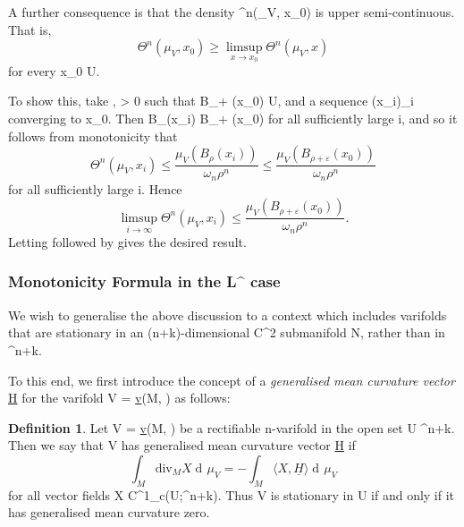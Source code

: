 \documentclass[a4paper, 11pt]{article}
\theoremstyle{plain}
\theoremstyle{definition}
\newtheorem{definition}[theorem]{Definition}
\theoremstyle{remark}
\DeclareMathOperator{\diff}{d \!}
\renewcommand{\div}{\text{div}} %
\numberwithin{equation}{subsection}
\def\({}
\def\){}
\begin{document}
A further consequence is that the density \(\Theta^{n}(\mu_V, x_0)\) is upper semi-continuous. That is,
\begin{equation}
\Theta^{n}(\mu_V, x_0) \geqslant \limsup_{x \rightarrow x_0} \Theta^{n}(\mu_V, x)
\end{equation}
for every \(x_0 \in U\).

To show this, take \(\rho, \varepsilon > 0\) such that \(B_{\rho + \varepsilon}(x_{0}) \subset U\), and a sequence \((x_{i})_{i}\) converging to \(x_{0}\). Then \(B_{\rho}(x_{i}) \subset B_{\rho + \varepsilon}(x_{0})\) for all sufficiently large \(i\), and so it follows from monotonicity that
\begin{equation}
\Theta^{n}(\mu_V, x_i) \leqslant \frac{\mu_V(B_{\rho}(x_i))}{\omega_{n}\rho^{n}} \leqslant \frac{\mu_V(B_{\rho + \varepsilon}(x_0))}{\omega_{n}\rho^{n}}
\end{equation}
for all sufficiently large \(i\). Hence
\begin{equation}
\limsup_{i \rightarrow \infty} \Theta^{n}(\mu_V, x_i) \leqslant \frac{\mu_V(B_{\rho + \varepsilon}(x_0))}{\omega_{n}\rho^{n}}.
\end{equation}
Letting \(\varepsilon {}\) followed by \(\rho {}\) gives the desired result.

\subsubsection{Monotonicity Formula in the \texorpdfstring{\(L^{\infty}\)}{L-infinity} case}

We wish to generalise the above discussion to a context which includes varifolds that are stationary in an \((n+k)\)-dimensional \(C^2\) submanifold \(N\), rather than in \(^{n+k}\).

To this end, we first introduce the concept of a \emph{generalised mean curvature vector} \(\underline{H}\) for the varifold \(V = \underline{v}(M, \theta)\) as follows:

\begin{definition}
Let \(V = \underline{v}(M, \theta)\) be a rectifiable \(n\)-varifold in the open set \(U \subset {}^{n+k}\). Then we say that \(V\) has generalised mean curvature vector \(\underline{H}\) if
\begin{equation}
\int_{M}\div_{M}X \diff\mu_V = -\int_{M} \langle X, \underline{H} \rangle \diff\mu_V
\end{equation}
for all vector fields \(X \in C^{1}_{c}(U;^{n+k})\). Thus \(V\) is stationary in \(U\) if and only if it has generalised mean curvature zero.
\end{definition}
\end{document}
